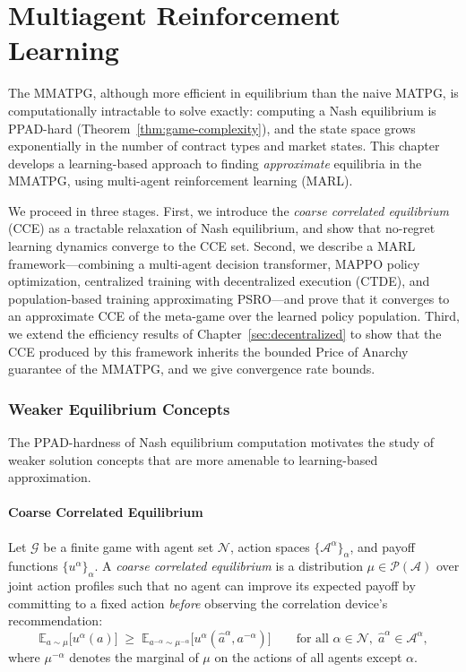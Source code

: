 \chapter{Multiagent Reinforcement Learning}\label{chap:marl}

The MMATPG, although more efficient in equilibrium than the naive MATPG, is computationally intractable to solve exactly: computing a Nash equilibrium is PPAD-hard (Theorem~\ref{thm:game-complexity}), and the state space grows exponentially in the number of contract types and market states. This chapter develops a learning-based approach to finding \emph{approximate} equilibria in the MMATPG, using multi-agent reinforcement learning (MARL).

We proceed in three stages. First, we introduce the \emph{coarse correlated equilibrium} (CCE) as a tractable relaxation of Nash equilibrium, and show that no-regret learning dynamics converge to the CCE set. Second, we describe a MARL framework---combining a multi-agent decision transformer, MAPPO policy optimization, centralized training with decentralized execution (CTDE), and population-based training approximating PSRO---and prove that it converges to an approximate CCE of the meta-game over the learned policy population. Third, we extend the efficiency results of Chapter~\ref{sec:decentralized} to show that the CCE produced by this framework inherits the bounded Price of Anarchy guarantee of the MMATPG, and we give convergence rate bounds.


\subsection{Weaker Equilibrium Concepts}\label{sec:weaker-eq}

The PPAD-hardness of Nash equilibrium computation motivates the study of weaker solution concepts that are more amenable to learning-based approximation.


\subsubsection{Coarse Correlated Equilibrium}

\begin{definition}
Let $\mathcal{G}$ be a finite game with agent set $\mathcal{N}$, action spaces $\{\mathcal{A}^\alpha\}_\alpha$, and payoff functions $\{u^\alpha\}_\alpha$. A \emph{coarse correlated equilibrium} is a distribution $\mu\in\mathcal{P}(\mathcal{A})$ over joint action profiles such that no agent can improve its expected payoff by committing to a fixed action \emph{before} observing the correlation device's recommendation:
\[
\mathbb{E}_{a\sim\mu}\big[u^\alpha(a)\big] \;\ge\; \mathbb{E}_{a^{-\alpha}\sim\mu^{-\alpha}}\big[u^\alpha(\hat a^\alpha, a^{-\alpha})\big]
\qquad\text{for all }\alpha\in\mathcal{N},\;\hat a^\alpha\in\mathcal{A}^\alpha,
\]
where $\mu^{-\alpha}$ denotes the marginal of $\mu$ on the actions of all agents except $\alpha$.
\end{definition}

